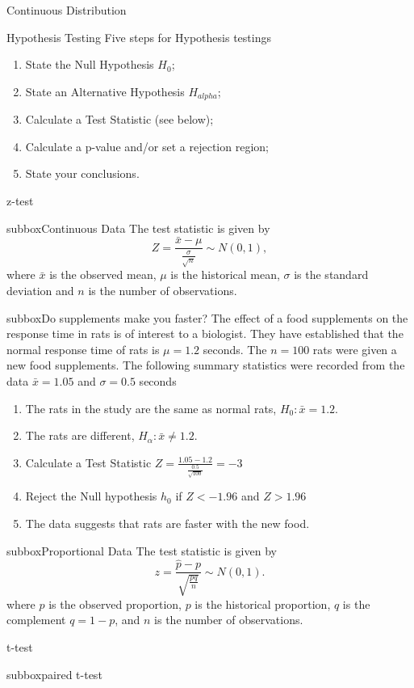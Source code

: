 \documentclass[10pt,a4paper]{article}
\begin{document}
\begin{multicols}{3}
\begin{textbox}{Continuous Distribution}
\end{textbox}
\begin{textbox}{Hypothesis Testing}
Five steps for Hypothesis testings
\begin{enumerate}
\item  State the Null Hypothesis $H_0$;
\item  State an Alternative Hypothesis $H_{ alpha}$;
\item  Calculate a Test Statistic (see below);
\item  Calculate a p-value and/or set a rejection region;
\item  State your conclusions.
\end{enumerate}
\end{textbox}
\begin{textbox}{z-test}
\begin{subbox}{subbox}{Continuous Data}
The test statistic is given by
\[Z=\frac{\bar{x}-\mu}{\frac{\sigma}{\sqrt{n}}} \sim N(0,1), \]
where $\bar{x}$ is the observed mean, $\mu$ is the historical mean, $\sigma$ is the standard deviation and $n$ is the number of observations.

\begin{subbox}{subbox}{Do supplements make you faster? }
\tiny
The effect of a food supplements on the response time in rats is of interest to a biologist. They have established that the normal response time of rats is $\mu=1.2$ seconds. The $n=100$ rats were given a new food supplements. The following summary statistics were recorded from the data $\bar{x}=1.05$ and $\sigma= 0.5$ seconds
\begin{enumerate}
    \item The rats in the study are the same as normal rats,  $H_0 : \bar{x}=1.2$. 
\item The rats are different, $H_\alpha:\bar{x}\not= 1.2$.
\item Calculate a Test Statistic $Z=\frac{1.05-1.2}{\frac{0.5}{\sqrt{100}}}=-3 $
\item Reject the Null hypothesis $h_0$ if $Z<-1.96$ and $Z>1.96$
\item The data suggests that rats are faster with the new food.
\end{enumerate}


\end{subbox}
\end{subbox}
\begin{subbox}{subbox}{Proportional Data}
The test statistic is given by
\[z=\frac{\hat{p}-p}{\sqrt{\frac{pq}{n}}} \sim N(0,1). \]
where $\hat{p}$ is the observed proportion, $p$ is the historical proportion, $q$ is the complement $q=1-p$,  and $n$ is the number of observations.
\end{subbox}
\end{textbox}
\begin{textbox}{t-test}
\begin{subbox}{subbox}{paired t-test}


\end{subbox}
\end{textbox}
\end{multicols}
\end{document}
